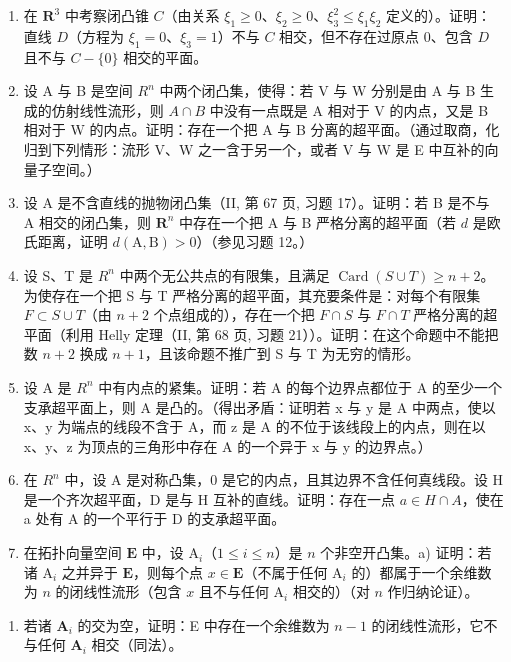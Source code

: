 \begin{enumerate}
\def\labelenumi{\arabic{enumi})}
\setcounter{enumi}{11}
\item
  在 \(\mathbf{R}^3\) 中考察闭凸锥 \(C\)（由关系 \(\xi_1 \geqslant 0\)、\(\xi_2 \geqslant 0\)、\(\xi_3^2 \leqslant \xi_1\xi_2\) 定义的）。证明：直线 \(D\)（方程为 \(\xi_1 = 0\)、\(\xi_3 = 1\)）不与 \(C\) 相交，但不存在过原点 \(0\)、包含 \(D\) 且不与 \(C - \{0\}\) 相交的平面。
\item
  设 A 与 B 是空间 \(R^{n}\) 中两个闭凸集，使得：若 V 与 W 分别是由 A 与 B 生成的仿射线性流形，则 \(A \cap B\) 中没有一点既是 A 相对于 V 的内点，又是 B 相对于 W 的内点。证明：存在一个把 A 与 B 分离的超平面。（通过取商，化归到下列情形：流形 V、W 之一含于另一个，或者 V 与 W 是 E 中互补的向量子空间。）
\item
  设 A 是不含直线的抛物闭凸集（II, 第 67 页, 习题 17）。证明：若 B 是不与 A 相交的闭凸集，则 \(\mathbf{R}^n\) 中存在一个把 A 与 B 严格分离的超平面（若 \(d\) 是欧氏距离，证明 \(d(\mathrm{A},\mathrm{B}) > 0\)）（参见习题 12。）
\item
  设 S、T 是 \(R^{n}\) 中两个无公共点的有限集，且满足 \(\operatorname{Card}(S \cup T) \geqslant n + 2\)。为使存在一个把 S 与 T 严格分离的超平面，其充要条件是：对每个有限集 \(F \subset S \cup T\)（由 \(n + 2\) 个点组成的），存在一个把 \(F \cap S\) 与 \(F \cap T\) 严格分离的超平面（利用 Helly 定理（II, 第 68 页, 习题 21））。证明：在这个命题中不能把数 \(n + 2\) 换成 \(n + 1\)，且该命题不推广到 S 与 T 为无穷的情形。
\item
  设 A 是 \(R^{n}\) 中有内点的紧集。证明：若 A 的每个边界点都位于 A 的至少一个支承超平面上，则 A 是凸的。（得出矛盾：证明若 x 与 y 是 A 中两点，使以 x、y 为端点的线段不含于 A，而 z 是 A 的不位于该线段上的内点，则在以 x、y、z 为顶点的三角形中存在 A 的一个异于 x 与 y 的边界点。）
\item
  在 \(R^{n}\) 中，设 A 是对称凸集，0 是它的内点，且其边界不含任何真线段。设 H 是一个齐次超平面，D 是与 H 互补的直线。证明：存在一点 \(a \in H \cap A\)，使在 a 处有 A 的一个平行于 D 的支承超平面。
\item
  在拓扑向量空间 \(\mathbf{E}\) 中，设 \(\mathrm{A}_i\)（\(1 \leqslant i \leqslant n\)）是 \(n\) 个非空开凸集。a) 证明：若诸 \(\mathrm{A}_i\) 之并异于 \(\mathbf{E}\)，则每个点 \(x \in \mathbf{E}\)（不属于任何 \(\mathrm{A}_i\) 的）都属于一个余维数为 \(n\) 的闭线性流形（包含 \(x\) 且不与任何 \(\mathrm{A}_i\) 相交的）（对 \(n\) 作归纳论证）。
\end{enumerate}

\begin{enumerate}
\def\labelenumi{\alph{enumi})}
\setcounter{enumi}{1}
\tightlist
\item
  若诸 \(\mathbf{A}_i\) 的交为空，证明：E 中存在一个余维数为 \(n - 1\) 的闭线性流形，它不与任何 \(\mathbf{A}_i\) 相交（同法）。
\end{enumerate}

